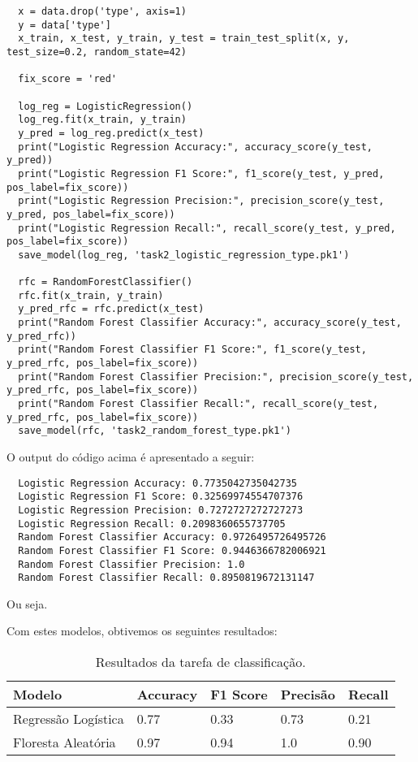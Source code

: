 \documentclass{article}
\begin{document}
\begin{verbatim}
  x = data.drop('type', axis=1)
  y = data['type']
  x_train, x_test, y_train, y_test = train_test_split(x, y, test_size=0.2, random_state=42)

  fix_score = 'red'

  log_reg = LogisticRegression()
  log_reg.fit(x_train, y_train)
  y_pred = log_reg.predict(x_test)
  print("Logistic Regression Accuracy:", accuracy_score(y_test, y_pred))
  print("Logistic Regression F1 Score:", f1_score(y_test, y_pred, pos_label=fix_score))
  print("Logistic Regression Precision:", precision_score(y_test, y_pred, pos_label=fix_score))
  print("Logistic Regression Recall:", recall_score(y_test, y_pred, pos_label=fix_score))
  save_model(log_reg, 'task2_logistic_regression_type.pk1')

  rfc = RandomForestClassifier()
  rfc.fit(x_train, y_train)
  y_pred_rfc = rfc.predict(x_test)
  print("Random Forest Classifier Accuracy:", accuracy_score(y_test, y_pred_rfc))
  print("Random Forest Classifier F1 Score:", f1_score(y_test, y_pred_rfc, pos_label=fix_score))
  print("Random Forest Classifier Precision:", precision_score(y_test, y_pred_rfc, pos_label=fix_score))
  print("Random Forest Classifier Recall:", recall_score(y_test, y_pred_rfc, pos_label=fix_score))
  save_model(rfc, 'task2_random_forest_type.pk1')
\end{verbatim}

O output do código acima é apresentado a seguir:

\begin{verbatim}
  Logistic Regression Accuracy: 0.7735042735042735
  Logistic Regression F1 Score: 0.32569974554707376
  Logistic Regression Precision: 0.7272727272727273
  Logistic Regression Recall: 0.2098360655737705
  Random Forest Classifier Accuracy: 0.9726495726495726
  Random Forest Classifier F1 Score: 0.9446366782006921
  Random Forest Classifier Precision: 1.0
  Random Forest Classifier Recall: 0.8950819672131147
\end{verbatim}

Ou seja.

Com estes modelos, obtivemos os seguintes resultados:

\begin{table}[ht]
  \centering
  \begin{tabular}{@{}lllll@{}}
    \toprule
    Modelo & Accuracy & F1 Score & Precisão & Recall \\ \midrule
    Regressão Logística & 0.77 & 0.33 & 0.73 & 0.21 \\
    Floresta Aleatória & 0.97 & 0.94 & 1.0 & 0.90 \\ \bottomrule
  \end{tabular}
  \caption{Resultados da tarefa de classificação.}
  \label{tab:task2_results}
\end{table}
\end{document}
